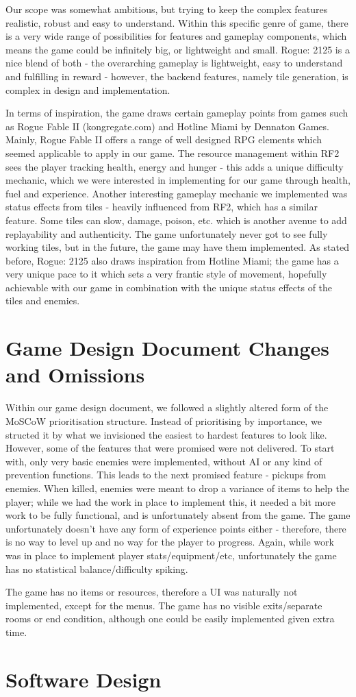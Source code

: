 \documentclass[12pt]{article}
\begin{document}
Our scope was somewhat ambitious, but trying to keep the complex features realistic, robust and easy to understand. Within this specific genre of game, there is a very wide range of possibilities for features and gameplay components, which means the game could be infinitely big, or lightweight and small. Rogue: 2125 is a nice blend of both - the overarching gameplay is lightweight, easy to understand and fulfilling in reward - however, the backend features, namely tile generation, is complex in design and implementation. \linebreak

In terms of inspiration, the game draws certain gameplay points from games such as Rogue Fable II (kongregate.com) and Hotline Miami by Dennaton Games. Mainly, Rogue Fable II offers a range of well designed RPG elements which seemed applicable to apply in our game. The resource management within RF2 sees the player tracking health, energy and hunger - this adds a unique difficulty mechanic, which we were interested in implementing for our game through health, fuel and experience. Another interesting gameplay mechanic we implemented was status effects from tiles - heavily influenced from RF2, which has a similar feature. Some tiles can slow, damage, poison, etc. which is another avenue to add replayability and authenticity. The game unfortunately never got to see fully working tiles, but in the future, the game may have them implemented. As stated before, Rogue: 2125 also draws inspiration from Hotline Miami; the game has a very unique pace to it which sets a very frantic style of movement, hopefully achievable with our game in combination with the unique status effects of the tiles and enemies.

\clearpage

\section{Game Design Document Changes and Omissions}

Within our game design document, we followed a slightly altered form of the MoSCoW prioritisation structure. Instead of prioritising by importance, we structed it by what we invisioned the easiest to hardest features to look like. However, some of the features that were promised were not delivered. To start with, only very basic enemies were implemented, without AI or any kind of prevention functions. This leads to the next promised feature - pickups from enemies. When killed, enemies were meant to drop a variance of items to help the player; while we had the work in place to implement this, it needed a bit more work to be fully functional, and is unfortunately absent from the game. The game unfortunately doesn't have any form of experience points either - therefore, there is no way to level up and no way for the player to progress. Again, while work was in place to implement player stats/equipment/etc, unfortunately the game has no statistical balance/difficulty spiking. \linebreak

The game has no items or resources, therefore a UI was naturally not implemented, except for the menus. The game has no visible exits/separate rooms or end condition, although one could be easily implemented given extra time.

\clearpage

\section{Software Design}
\end{document}
